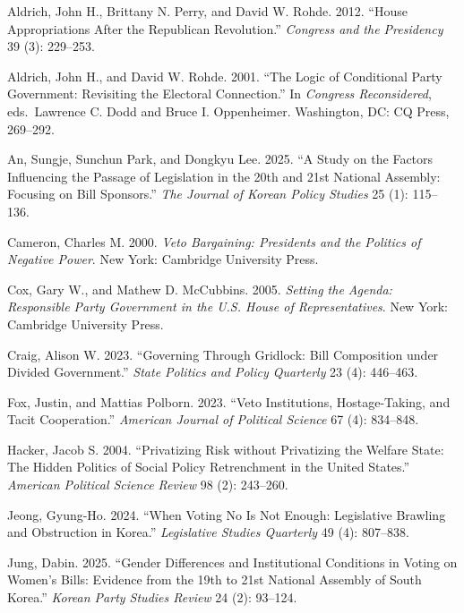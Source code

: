 \documentclass[11pt]{article}
\begin{document}
\begin{description}

\item Aldrich, John H., Brittany N. Perry, and David W. Rohde. 2012. ``House Appropriations After the Republican Revolution.'' \textit{Congress and the Presidency} 39 (3): 229--253.

\item Aldrich, John H., and David W. Rohde. 2001. ``The Logic of Conditional Party Government: Revisiting the Electoral Connection.'' In \textit{Congress Reconsidered}, eds.\ Lawrence C. Dodd and Bruce I. Oppenheimer. Washington, DC: CQ Press, 269--292.

\item An, Sungje, Sunchun Park, and Dongkyu Lee. 2025. ``A Study on the Factors Influencing the Passage of Legislation in the 20th and 21st National Assembly: Focusing on Bill Sponsors.'' \textit{The Journal of Korean Policy Studies} 25 (1): 115--136.

\item Cameron, Charles M. 2000. \textit{Veto Bargaining: Presidents and the Politics of Negative Power}. New York: Cambridge University Press.

\item Cox, Gary W., and Mathew D. McCubbins. 2005. \textit{Setting the Agenda: Responsible Party Government in the U.S. House of Representatives}. New York: Cambridge University Press.

\item Craig, Alison W. 2023. ``Governing Through Gridlock: Bill Composition under Divided Government.'' \textit{State Politics and Policy Quarterly} 23 (4): 446--463.

\item Fox, Justin, and Mattias Polborn. 2023. ``Veto Institutions, Hostage-Taking, and Tacit Cooperation.'' \textit{American Journal of Political Science} 67 (4): 834--848.

\item Hacker, Jacob S. 2004. ``Privatizing Risk without Privatizing the Welfare State: The Hidden Politics of Social Policy Retrenchment in the United States.'' \textit{American Political Science Review} 98 (2): 243--260.

\item Jeong, Gyung-Ho. 2024. ``When Voting No Is Not Enough: Legislative Brawling and Obstruction in Korea.'' \textit{Legislative Studies Quarterly} 49 (4): 807--838.

\item Jung, Dabin. 2025. ``Gender Differences and Institutional Conditions in Voting on Women's Bills: Evidence from the 19th to 21st National Assembly of South Korea.'' \textit{Korean Party Studies Review} 24 (2): 93--124.


\end{description}
\end{document}
